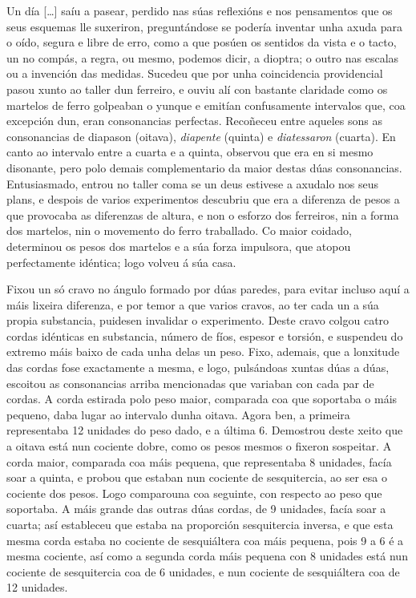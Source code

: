 \begin{multicols}{3}
\setlength{\columnseprule}{1pt}
{\small
\noindent
Un día {[}\ldots{]} saíu a pasear, perdido nas súas reflexións e nos pensamentos que os seus esquemas lle suxeriron, preguntándose se podería inventar unha axuda para o oído, segura e libre de erro, como a que posúen os sentidos da vista e o tacto, un no compás, a regra, ou mesmo, podemos dicir, a dioptra; o outro nas escalas ou a invención das medidas. Sucedeu que por unha coincidencia providencial pasou xunto ao taller dun ferreiro, e ouviu alí con bastante claridade como os martelos de ferro golpeaban o yunque e emitían confusamente intervalos que, coa excepción dun, eran consonancias perfectas. Recoñeceu entre aqueles sons as consonancias de diapason (oitava), \emph{diapente} (quinta) e \emph{diatessaron} (cuarta). En canto ao intervalo entre a cuarta e a quinta, observou que era en si mesmo disonante, pero polo demais complementario da maior destas dúas consonancias. Entusiasmado, entrou no taller coma se un deus estivese a axudalo nos seus plans, e despois de varios experimentos descubriu que era a diferenza de pesos a que provocaba as diferenzas de altura, e non o esforzo dos ferreiros, nin a forma dos martelos, nin o movemento do ferro traballado. Co maior coidado, determinou os pesos dos martelos e a súa forza impulsora, que atopou perfectamente idéntica; logo volveu á súa casa.

\noindent
Fixou un só cravo no ángulo formado por dúas paredes, para evitar incluso aquí a máis lixeira diferenza, e por temor a que varios cravos, ao ter cada un a súa propia substancia, puidesen invalidar o experimento. Deste cravo colgou catro cordas idénticas en substancia,
número de fíos, espesor e torsión, e suspendeu do extremo máis baixo de cada unha delas un peso. Fixo, ademais, que a lonxitude das cordas fose exactamente a mesma, e logo, pulsándoas xuntas dúas a dúas, escoitou as consonancias arriba mencionadas que variaban con cada par de cordas. A corda estirada polo peso maior, comparada coa que soportaba o máis pequeno, daba lugar ao intervalo dunha oitava. Agora ben, a primeira representaba 12 unidades do peso dado, e a última 6. Demostrou deste xeito que a oitava está nun cociente dobre, como os pesos mesmos o fixeron sospeitar. A corda maior, comparada coa máis pequena, que representaba 8 unidades, facía soar a quinta, e probou que estaban nun cociente de sesquitercia, ao ser esa o cociente dos pesos. Logo comparouna coa seguinte, con respecto ao peso que soportaba. A máis grande das outras dúas cordas, de 9 unidades, facía soar a cuarta; así estableceu que estaba na proporción sesquitercia inversa, e que esta mesma corda estaba no cociente de sesquiáltera coa máis pequena, pois 9 a 6 é a mesma cociente, así como a segunda corda máis pequena con 8 unidades está nun cociente de sesquitercia coa de 6 unidades, e nun cociente de sesquiáltera coa de 12 unidades.

}
\end{multicols}
